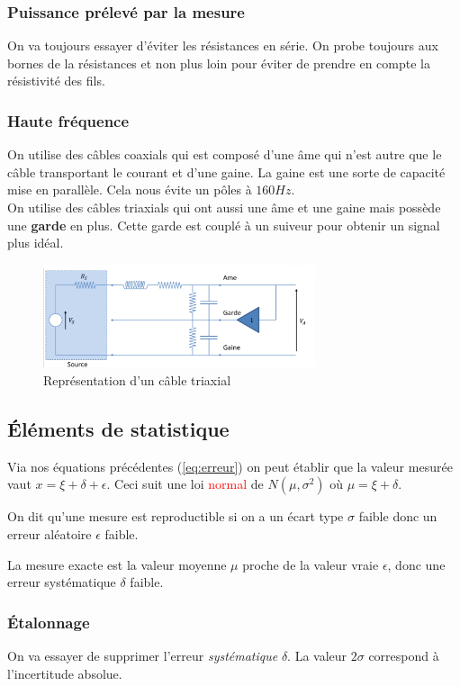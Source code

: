 \documentclass{report}
\begin{document}
\subsubsection{Puissance prélevé par la mesure}
On va toujours essayer d'éviter les résistances en série. On probe toujours aux bornes de la résistances et non plus loin pour éviter de prendre en compte la résistivité des fils.

\subsubsection{Haute fréquence}
On utilise des câbles coaxials qui est composé d'une âme qui n'est autre que le câble transportant le courant et d'une gaine. La gaine est une sorte de capacité mise en parallèle. Cela nous évite un pôles à $160 Hz$.\\

On utilise des câbles triaxials qui ont aussi une âme et une gaine mais possède une \textbf{garde} en plus. Cette garde est couplé à un suiveur pour obtenir un signal plus idéal.
\begin{figure}[H]
\centering
\includegraphics[width=8cm]{img/triaxial.png}
\caption{Représentation d'un câble triaxial}
\end{figure}

\subsection{Éléments de statistique}
Via nos équations précédentes (\ref{eq:erreur}) on peut établir que la valeur mesurée vaut $x = \xi + \delta + \epsilon$. Ceci suit une loi \textcolor{red}{normal} de $N(\mu , \sigma^2)$ où $\mu = \xi + \delta $.\par 
On dit qu'une mesure est reproductible si on a un écart type $\sigma$ faible donc un erreur aléatoire $\epsilon $ faible.\par 
La mesure exacte est la valeur moyenne $\mu$ proche de la valeur vraie $\epsilon$, donc une erreur systématique $\delta$ faible.

\subsubsection{Étalonnage}
On va essayer de supprimer l'erreur \textit{systématique} $\delta$. La valeur $2 \sigma$ correspond à l'incertitude absolue.
\end{document}
